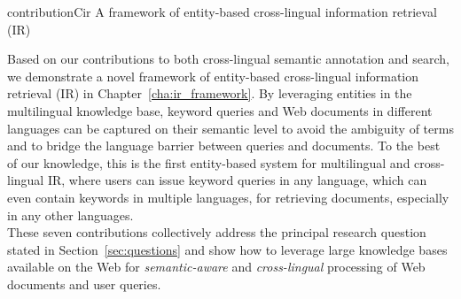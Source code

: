\begin{restatable}{contribution}{Cir} \label{c:ir}
A framework of entity-based cross-lingual information retrieval (IR)
\end{restatable}
\vspace{-0.9em}
\noindent Based on our contributions to both cross-lingual semantic annotation and search, we demonstrate a novel framework of entity-based cross-lingual information retrieval (IR) in Chapter~\ref{cha:ir_framework}. By leveraging entities in the multilingual knowledge base,  keyword queries and Web documents in different languages can be captured on their semantic level to avoid the ambiguity of terms and to bridge the language barrier between queries and documents. To the best of our knowledge, this is the first entity-based system for multilingual and cross-lingual IR, where users can issue keyword queries in any language, which can even contain keywords in multiple languages, for retrieving documents, especially in any other languages. 
\\

These seven contributions collectively address the principal research question stated in Section~\ref{sec:questions} and show how to leverage large knowledge bases available on the Web for \emph{semantic-aware} and \emph{cross-lingual} processing of Web documents and user queries.
